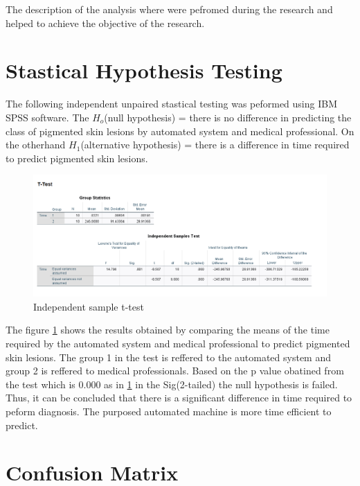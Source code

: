 The description of the analysis where were pefromed during the
research and helped to achieve the objective of the research.

\section{Stastical Hypothesis Testing}
The following independent unpaired stastical testing was peformed using 
IBM SPSS software. The ${H_o}$(null hypothesis) = there is no difference in 
predicting the class of pigmented skin lesions by automated system and 
medical professional. On the otherhand ${H_1}$(alternative hypothesis) = there is 
a difference in time required to predict pigmented skin lesions.
\begin{figure}[!htp]
    \includegraphics[width=15cm]{Images/ttest.png}
    \caption{Independent sample t-test}
    \label{fig:istt}
\end{figure}

The figure \ref{fig:istt} shows the results obtained by comparing the 
means of the time required by the automated system and medical professional to predict pigmented skin 
lesions. The group 1 in the test is reffered to the automated system and 
group 2 is reffered to medical professionals. Based on the p value obatined from the 
test which is 0.000 as in \ref{fig:istt} in the Sig(2-tailed) the null 
hypothesis is failed. Thus, it can be concluded that there is a significant 
difference in time required to peform diagnosis. The purposed automated machine 
is more time efficient to predict.

\section{Confusion Matrix}